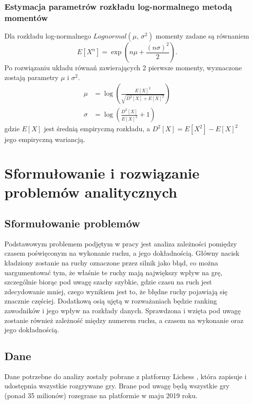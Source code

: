 \documentclass[inzynierska]{pwr_wmat_praca_dyplomowa}
\theoremstyle{plain}
\numberwithin{theorem}{chapter}
\theoremstyle{definition}
\numberwithin{theorem}{chapter}
\begin{document}
\subsection{Estymacja parametrów rozkładu log-normalnego metodą momentów}
Dla rozkładu log-normalnego $Lognormal(\mu ,\,\sigma^{2})$ momenty zadane są równaniem \cite{lognorm}
\begin{equation*}
	E[X^n] = \exp (n\mu+\frac{(n\sigma)^2}{2}).
\end{equation*}
Po rozwiązaniu układu równań zawierających 2 pierwsze momenty, wyznaczone zostają parametry $\mu$ i $\sigma^2$. 
\begin{align*} 
	\mu &= \log\left(\frac{E[X]^2}{\sqrt{D^2[X]+E[X]^2}}\right) \\ 
	\sigma &=  \log\left(\frac{D^2[X]}{E[X]^2}+1\right)
\end{align*}
gdzie $E[X]$ jest średnią empiryczną rozkładu, a $D^2[X]=E[X^2]-E[X]^2$ jego empiryczną wariancją.


\chapter{Sformułowanie i rozwiązanie problemów analitycznych}
\section{Sformułowanie problemów}
Podstawowym problemem podjętym w pracy jest analiza zależności pomiędzy czasem poświęconym na wykonanie ruchu, a jego dokładnością. Główny nacisk kładziony zostanie na ruchy oznaczone przez silnik jako błąd, co można uargumentować tym, że właśnie te ruchy mają największy wpływ na grę, szczególnie biorąc pod uwagę szachy szybkie, gdzie czasu na ruch jest zdecydowanie mniej, czego wynikiem jest to, że błędne ruchy pojawiają się znacznie częściej. Dodatkową osią ujętą w rozważaniach będzie ranking zawodników i jego wpływ na rozkłady danych. Sprawdzona i wzięta pod uwagę zostanie również zależność między numerem ruchu, a czasem na wykonanie oraz jego dokładnością.

\section{Dane}
Dane potrzebne do analizy zostały pobrane z platformy Lichess \cite{lichess}, która zapisuje i udostępnia wszystkie rozgrywane gry. Brane pod uwagę będą wszystkie gry (ponad 35 milionów) rozegrane na platformie w maju 2019 roku.
\end{document}
